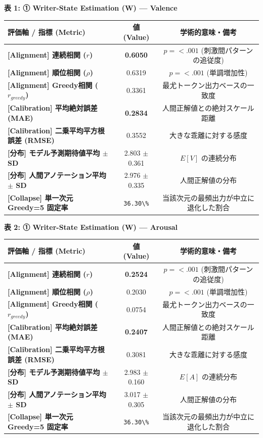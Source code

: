 \textbf{表 1: ① Writer-State Estimation (W) — Valence}
\begin{center}
\small
\begin{tabular}{lcc}
\toprule
\textbf{評価軸 / 指標 (Metric)} & \textbf{値 (Value)} & \textbf{学術的意味・備考} \\
\midrule
\textbf{[Alignment] 連続相関 ($r$)} & \textbf{0.6050} & $p = <.001 $ (刺激間パターンの追従度) \\
\textbf{[Alignment] 順位相関 ($\rho$)} & 0.6319 & $p = <.001 $ (単調増加性) \\
\textbf{[Alignment] Greedy相関 ($r_{greedy}$)} & 0.3361 & 最尤トークン出力ベースの一致度 \\
\textbf{[Calibration] 平均絶対誤差 (MAE)} & \textbf{0.2834} & 人間正解値との絶対スケール距離 \\
\textbf{[Calibration] 二乗平均平方根誤差 (RMSE)} & 0.3552 & 大きな乖離に対する感度 \\
\textbf{[分布] モデル予測期待値平均 $\pm$ SD} & 2.803 $\pm$ 0.361 & $E[V]$ の連続分布 \\
\textbf{[分布] 人間アノテーション平均 $\pm$ SD} & 2.976 $\pm$ 0.335 & 人間正解値の分布 \\
\textbf{[Collapse] 単一次元 Greedy=5 固定率} & \texttt{36.30\textbackslash{}\%} & 当該次元の最頻出力が中立に退化した割合 \\
\bottomrule
\end{tabular}
\end{center}


\textbf{表 2: ① Writer-State Estimation (W) — Arousal}
\begin{center}
\small
\begin{tabular}{lcc}
\toprule
\textbf{評価軸 / 指標 (Metric)} & \textbf{値 (Value)} & \textbf{学術的意味・備考} \\
\midrule
\textbf{[Alignment] 連続相関 ($r$)} & \textbf{0.2524} & $p = <.001 $ (刺激間パターンの追従度) \\
\textbf{[Alignment] 順位相関 ($\rho$)} & 0.2030 & $p = <.001 $ (単調増加性) \\
\textbf{[Alignment] Greedy相関 ($r_{greedy}$)} & 0.0754 & 最尤トークン出力ベースの一致度 \\
\textbf{[Calibration] 平均絶対誤差 (MAE)} & \textbf{0.2407} & 人間正解値との絶対スケール距離 \\
\textbf{[Calibration] 二乗平均平方根誤差 (RMSE)} & 0.3081 & 大きな乖離に対する感度 \\
\textbf{[分布] モデル予測期待値平均 $\pm$ SD} & 2.983 $\pm$ 0.160 & $E[A]$ の連続分布 \\
\textbf{[分布] 人間アノテーション平均 $\pm$ SD} & 3.017 $\pm$ 0.305 & 人間正解値の分布 \\
\textbf{[Collapse] 単一次元 Greedy=5 固定率} & \texttt{36.30\textbackslash{}\%} & 当該次元の最頻出力が中立に退化した割合 \\
\bottomrule
\end{tabular}
\end{center}


